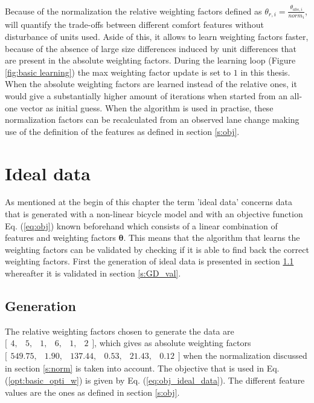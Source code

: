 Because of the normalization the relative weighting factors defined as $\theta_{r,i} = \frac{\theta_{abs,i}}{norm_i}$, will quantify the trade-offs between different comfort features without disturbance of units used. Aside of this, it allows to learn weighting factors faster, because of the absence of large size differences induced by unit differences that are present in the absolute weighting factors. During the learning loop (Figure \ref{fig:basic learning}) the max weighting factor update is set to $1$ in this thesis. When the absolute weighting factors are learned instead of the relative ones, it would give a substantially higher amount of iterations when started from an all-one vector as initial guess. When the algorithm is used in practise, these normalization factors can be recalculated from an observed lane change making use of the definition of the features as defined in section \ref{s:obj}.

\section{Ideal data} \label{s:GD}
As mentioned at the begin of this chapter the term 'ideal data' concerns data that is generated with a non-linear bicycle model and with an objective function Eq. (\ref{eq:obj}) known beforehand which consists of a linear combination of features and weighting factors $\bm{\theta}$. This means that the algorithm that learns the weighting factors can be validated by checking if it is able to find back the correct weighting factors. First the generation of ideal data is presented in section \ref{s:generation} whereafter it is validated in section \ref{s:GD_val}.

\subsection{Generation}
\label{s:generation}
The relative weighting factors chosen to generate the data are $ \bigl[ \begin{smallmatrix} 4,&5,&1,&6,&1,&2\end{smallmatrix}\bigr]$, which gives as absolute weighting factors  $ \bigl[ \begin{smallmatrix} 549.75, &1.90, &137.44  ,&0.53,  &21.43, &0.12\end{smallmatrix}\bigr]$ when the normalization discussed in section \ref{s:norm} is taken into account. The objective that is used in Eq. (\ref{opt:basic_opti_w}) is given by Eq. (\ref{eq:obj_ideal_data}). The different feature values are the ones as defined in section \ref{s:obj}.

